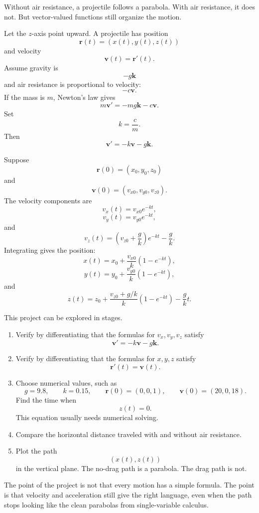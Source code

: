 Without air resistance, a projectile follows a parabola.  With air resistance, it does not.
But vector-valued functions still organize the motion.

Let the \(z\)-axis point upward.  A projectile has position
\[
    \mathbf r(t)=(x(t),y(t),z(t))
\]
and velocity
\[
    \mathbf v(t)=\mathbf r'(t).
\]
Assume gravity is
\[
    -g\mathbf k
\]
and air resistance is proportional to velocity:
\[
    -c\mathbf v.
\]
If the mass is \(m\), Newton's law gives
\[
    m\mathbf v'=-mg\mathbf k-c\mathbf v.
\]
Set
\[
    k=\frac{c}{m}.
\]
Then
\[
\boxed{
    \mathbf v'=-k\mathbf v-g\mathbf k.
}
\]

Suppose
\[
    \mathbf r(0)=(x_0,y_0,z_0)
\]
and
\[
    \mathbf v(0)=(v_{x0},v_{y0},v_{z0}).
\]
The velocity components are
\[
\boxed{
    v_x(t)=v_{x0}e^{-kt},
}
\]
\[
\boxed{
    v_y(t)=v_{y0}e^{-kt},
}
\]
and
\[
\boxed{
    v_z(t)=\left(v_{z0}+\frac{g}{k}\right)e^{-kt}-\frac{g}{k}.
}
\]
Integrating gives the position:
\[
\boxed{
    x(t)=x_0+\frac{v_{x0}}{k}\left(1-e^{-kt}\right),
}
\]
\[
\boxed{
    y(t)=y_0+\frac{v_{y0}}{k}\left(1-e^{-kt}\right),
}
\]
and
\[
\boxed{
    z(t)=
    z_0+
    \frac{v_{z0}+g/k}{k}\left(1-e^{-kt}\right)
    -\frac{g}{k}t.
}
\]

This project can be explored in stages.

\begin{enumerate}
\item Verify by differentiating that the formulas for \(v_x,v_y,v_z\) satisfy
\[
    \mathbf v'=-k\mathbf v-g\mathbf k.
\]

\item Verify by differentiating that the formulas for \(x,y,z\) satisfy
\[
    \mathbf r'(t)=\mathbf v(t).
\]

\item Choose numerical values, such as
\[
    g=9.8,\qquad k=0.15,\qquad
    \mathbf r(0)=(0,0,1),\qquad
    \mathbf v(0)=(20,0,18).
\]
Find the time when
\[
    z(t)=0.
\]
This equation usually needs numerical solving.

\item Compare the horizontal distance traveled with and without air resistance.

\item Plot the path
\[
    (x(t),z(t))
\]
in the vertical plane.  The no-drag path is a parabola.  The drag path is not.
\end{enumerate}

The point of the project is not that every motion has a simple formula.  The point is
that velocity and acceleration still give the right language, even when the path stops
looking like the clean parabolas from single-variable calculus.

